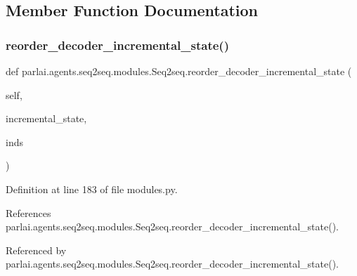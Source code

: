 \subsection{Member Function Documentation}
\mbox{\label{classparlai_1_1agents_1_1seq2seq_1_1modules_1_1Seq2seq_a8503e583661f0d824e0aa070b3d6ff42}} 
\subsubsection{\texorpdfstring{reorder\+\_\+decoder\+\_\+incremental\+\_\+state()}{reorder\_decoder\_incremental\_state()}}
{\footnotesize\ttfamily def parlai.\+agents.\+seq2seq.\+modules.\+Seq2seq.\+reorder\+\_\+decoder\+\_\+incremental\+\_\+state (\begin{DoxyParamCaption}\item[{}]{self,  }\item[{}]{incremental\+\_\+state,  }\item[{}]{inds }\end{DoxyParamCaption})}



Definition at line 183 of file modules.\+py.



References parlai.\+agents.\+seq2seq.\+modules.\+Seq2seq.\+reorder\+\_\+decoder\+\_\+incremental\+\_\+state().



Referenced by parlai.\+agents.\+seq2seq.\+modules.\+Seq2seq.\+reorder\+\_\+decoder\+\_\+incremental\+\_\+state().

